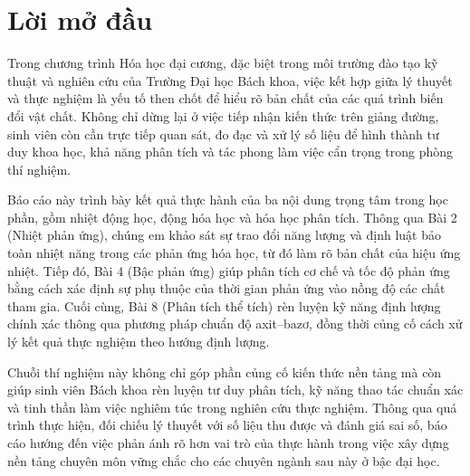 \chapter*{Lời mở đầu}

Trong chương trình Hóa học đại cương, đặc biệt trong môi trường đào tạo kỹ thuật và nghiên cứu của Trường Đại học Bách khoa, việc kết hợp giữa lý thuyết và thực nghiệm là yếu tố then chốt để hiểu rõ bản chất của các quá trình biến đổi vật chất. Không chỉ dừng lại ở việc tiếp nhận kiến thức trên giảng đường, sinh viên còn cần trực tiếp quan sát, đo đạc và xử lý số liệu để hình thành tư duy khoa học, khả năng phân tích và tác phong làm việc cẩn trọng trong phòng thí nghiệm.

Báo cáo này trình bày kết quả thực hành của ba nội dung trọng tâm trong học phần, gồm nhiệt động học, động hóa học và hóa học phân tích. Thông qua Bài 2 (Nhiệt phản ứng), chúng em khảo sát sự trao đổi năng lượng và định luật bảo toàn nhiệt năng trong các phản ứng hóa học, từ đó làm rõ bản chất của hiệu ứng nhiệt. Tiếp đó, Bài 4 (Bậc phản ứng) giúp phân tích cơ chế và tốc độ phản ứng bằng cách xác định sự phụ thuộc của thời gian phản ứng vào nồng độ các chất tham gia. Cuối cùng, Bài 8 (Phân tích thể tích) rèn luyện kỹ năng định lượng chính xác thông qua phương pháp chuẩn độ axit--bazơ, đồng thời củng cố cách xử lý kết quả thực nghiệm theo hướng định lượng.

Chuỗi thí nghiệm này không chỉ góp phần củng cố kiến thức nền tảng mà còn giúp sinh viên Bách khoa rèn luyện tư duy phân tích, kỹ năng thao tác chuẩn xác và tinh thần làm việc nghiêm túc trong nghiên cứu thực nghiệm. Thông qua quá trình thực hiện, đối chiếu lý thuyết với số liệu thu được và đánh giá sai số, báo cáo hướng đến việc phản ánh rõ hơn vai trò của thực hành trong việc xây dựng nền tảng chuyên môn vững chắc cho các chuyên ngành sau này ở bậc đại học.